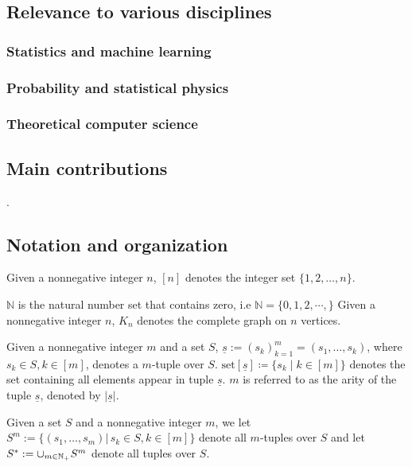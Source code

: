 \documentclass[letterpaper,11pt]{article}
\newcommand{\takesetp}[1]{\mathrm{set}[#1]}
\begin{document}
\begin{bibunit}[plainnat]
\subsection*{Relevance to various disciplines}

\subsubsection*{Statistics and machine learning}

\subsubsection*{Probability and statistical physics}

\citet{golse2016mean}

\subsubsection*{Theoretical computer science}

\subsection*{Main contributions}

\citet{zhao2024matrix}.

\subsection*{Notation and organization}

Given a nonnegative integer $n$, $[n]$ denotes the integer set $\{1, 2, \ldots, n\}$.

$\mathbb{N}$ is the natural number set that contains zero, i.e $\mathbb{N} = \{ 0,1,2,\cdots,\}$
Given a nonnegative integer $n$, $K_n$ denotes the complete graph on $n$ vertices.

Given a nonnegative integer $m$ and a set $S$, $\underline{s} := (s_k)_{k=1}^m = (s_1,\ldots, s_k)$, where $s_k \in S, k \in [m]$, denotes a $m$-tuple over $S$. $\takesetp{\underline{s}} \coloneqq \{s_k \mid k\in [m]\}$ denotes the set containing all elements appear in tuple $\underline{s}$. $m$ is referred to as the arity of the tuple $\underline{s}$, denoted by $|\underline{s}|$.

Given a set $S$ and a nonnegative integer $m$, we let $S^m := \{(s_1,\ldots,s_m)|\, s_k \in S, k \in [m] \}$ denote all $m$-tuples over $S$ and let $S^*:= \cup_{m \in {\mathbb{N}}_+} S^m$ denote all tuples over $S$. 


\end{bibunit}
\end{document}
